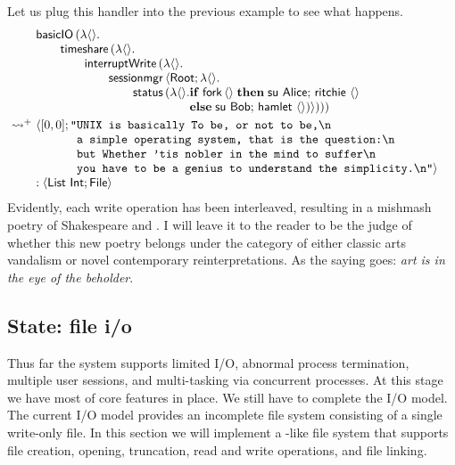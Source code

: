 \documentclass[12pt,phd,lfcs,twoside,openright,logo,leftchapter,normalheadings]{infthesis}
\theoremstyle{plain}
\theoremstyle{definition}
\begin{document}
Let us plug this handler into the previous example to see what
happens.
%
\[
  \ba{@{~}l@{~}l}
    &\bl
    \basicIO\,(\lambda\Unit.\\
         \qquad\timeshare\,(\lambda\Unit.\\
         \qquad\qquad\dec{interruptWrite}\,(\lambda\Unit.\\
         \qquad\qquad\qquad\sessionmgr\,\Record{\Root;\lambda\Unit.\\
         \qquad\qquad\qquad\qquad\status\,(\lambda\Unit.
                 \ba[t]{@{}l}
                   \If\;\fork\,\Unit\;\Then\;
                       \su~\Alice;\,
                       \quoteRitchie~\Unit\\
                   \Else\;
                       \su~\Bob;\,
                       \quoteHamlet~\Unit)})))
                 \ea
     \el \smallskip\\
     \reducesto^+&
     \bl
      \Record{
       \ba[t]{@{}l}
         [0, 0];
         \texttt{"}\ba[t]{@{}l}
         \texttt{UNIX is basically To be, or not to be,\nl{}}\\
         \texttt{a simple operating system, that is the question:\nl{}}\\
         \texttt{but Whether 'tis nobler in the mind to suffer\nl{}}\\
         \texttt{you have to be a genius to understand the simplicity.\nl{}"}}
         \ea
       \ea\\
       : \Record{\List~\Int; \UFile}
     \el
  \ea
\]
%
Evidently, each write operation has been interleaved, resulting in a
mishmash poetry of Shakespeare and \UNIX{}.
%
I will leave it to the reader to be the judge of whether this new
poetry belongs under the category of either classic arts vandalism or
novel contemporary reinterpretations.  As the saying goes: \emph{art
  is in the eye of the beholder}.

\subsection{State: file i/o}
\label{sec:tiny-unix-io}

Thus far the system supports limited I/O, abnormal process
termination, multiple user sessions, and multi-tasking via concurrent
processes. At this stage we have most of core features in place. We
still have to complete the I/O model. The current I/O model provides
an incomplete file system consisting of a single write-only file.
%
In this section we will implement a \UNIX{}-like file system that
supports file creation, opening, truncation, read and write
operations, and file linking.
%
\end{document}
